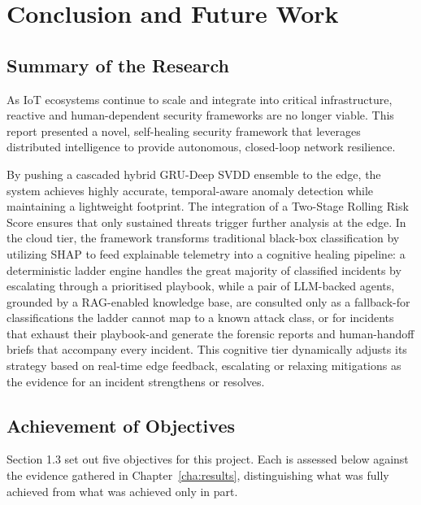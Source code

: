 \chapter{Conclusion and Future Work}\label{cha:conclusion}

\section{Summary of the Research}

As IoT ecosystems continue to scale and integrate into critical infrastructure, reactive and human-dependent security frameworks are no longer viable. This report presented a novel, self-healing security framework that leverages distributed intelligence to provide autonomous, closed-loop network resilience.

By pushing a cascaded hybrid GRU-Deep SVDD ensemble to the edge, the system achieves highly accurate, temporal-aware anomaly detection while maintaining a lightweight footprint. The integration of a Two-Stage Rolling Risk Score ensures that only sustained threats trigger further analysis at the edge. In the cloud tier, the framework transforms traditional black-box classification by utilizing SHAP to feed explainable telemetry into a cognitive healing pipeline: a deterministic ladder engine handles the great majority of classified incidents by escalating through a prioritised playbook, while a pair of LLM-backed agents, grounded by a RAG-enabled knowledge base, are consulted only as a fallback-for classifications the ladder cannot map to a known attack class, or for incidents that exhaust their playbook-and generate the forensic reports and human-handoff briefs that accompany every incident. This cognitive tier dynamically adjusts its strategy based on real-time edge feedback, escalating or relaxing mitigations as the evidence for an incident strengthens or resolves.

\section{Achievement of Objectives}

Section 1.3 set out five objectives for this project. Each is assessed below against the evidence gathered in Chapter~\ref{cha:results}, distinguishing what was fully achieved from what was achieved only in part.

